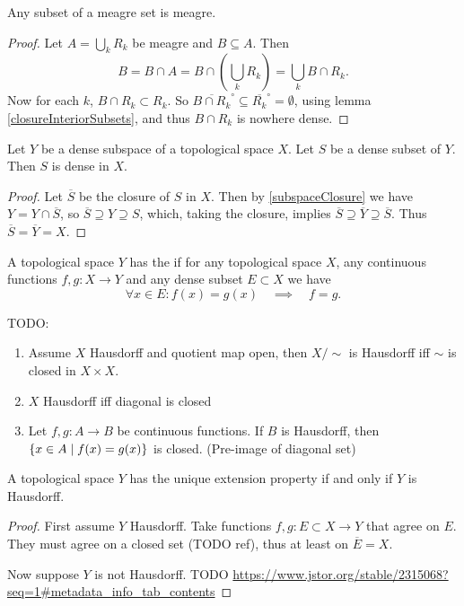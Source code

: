 \begin{lemma} \label{meagreSubset}
Any subset of a meagre set is meagre.
\end{lemma}
\begin{proof}
Let $A = \bigcup_k R_k$ be meagre and $B \subseteq A$. Then
\[ B = B\cap A = B\cap \left( \bigcup_k R_k \right) = \bigcup_k B\cap R_k. \]
Now for each $k$, $B\cap R_k \subset R_k$. So $\overline{B \cap R_k}^\circ \subseteq \overline{R_k}^\circ = \emptyset$, using lemma \ref{closureInteriorSubsets}, and thus $B\cap R_k$ is nowhere dense. 
\end{proof}

\begin{lemma} \label{denseSubsetOfDenseSubspaceIsDense}
Let $Y$ be a dense subspace of a topological space $X$. Let $S$ be a dense subset of $Y$. Then $S$ is dense in $X$.
\end{lemma}
\begin{proof}
Let $\overline{S}$ be the closure of $S$ in $X$. Then by \ref{subspaceClosure} we have $Y = Y\cap \overline{S}$, so $\overline{S} \supseteq Y \supseteq S$, which, taking the closure, implies $\overline{S} \supseteq \overline{Y} \supseteq \overline{S}$. Thus $\overline{S} = \overline{Y} = X$.
\end{proof}

\begin{definition}
A topological space $Y$ has the  if for any topological space $X$, any continuous functions $f,g:X\to Y$ and any dense subset $E\subset X$ we have
\[ \forall x\in E: f(x)=g(x) \quad\implies\quad f = g. \]
\end{definition}

TODO:
\begin{proposition}
\begin{enumerate}
\item Assume $X$ Hausdorff and quotient map open, then $X/\sim$ is Hausdorff iff $\sim$ is closed in $X\times X$.
\item $X$ Hausdorff iff diagonal is closed
\item Let $f,g: A\to B$ be continuous functions. If $B$ is Hausdorff, then $\left\{ x\in A \;\middle|\; f(x) = g(x) \right\}$ is closed. (Pre-image of diagonal set)
\end{enumerate}
\end{proposition}

\begin{proposition} \label{uniqueExtensionHausdorff}
A topological space $Y$ has the unique extension property \textup{if and only if} $Y$ is Hausdorff.
\end{proposition}
\begin{proof}
First assume $Y$ Hausdorff. Take functions $f,g: E\subset X \to Y$ that agree on $E$. They must agree on a closed set (TODO ref), thus at least on $\overline{E} = X$.

Now suppose $Y$ is not Hausdorff. TODO \url{https://www.jstor.org/stable/2315068?seq=1#metadata_info_tab_contents}
\end{proof}



